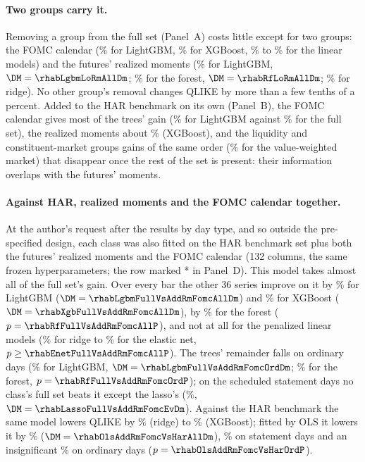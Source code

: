 \paragraph{Two groups carry it.}  Removing a group from the full set (Panel~A) costs little except for two groups: the
FOMC calendar (\rhabLgbmLoFomcAllPct\% for LightGBM, \rhabXgbLoFomcAllPct\% for XGBoost, \rhabRidgeLoFomcAllPct\% to
\rhabLassoLoFomcAllPct\% for the linear models) and the futures' realized moments (\rhabLgbmLoRmAllPct\% for LightGBM,
$\DM = \rhabLgbmLoRmAllDm$; \rhabRfLoRmAllPct\% for the forest, $\DM = \rhabRfLoRmAllDm$; \rhabRidgeLoRmAllPct\% for ridge).
No other group's removal changes QLIKE by more than a few tenths of a percent.  Added to the HAR benchmark on its own
(Panel~B), the FOMC calendar gives most of the trees' gain (\rhabLgbmAddFomcAllPct\% for LightGBM against
\rhabLgbmFullAllPct\% for the full set), the realized moments about \rhabXgbAddRmAllPct\% (XGBoost), and the liquidity
and constituent-market groups gains of the same order (\rhabXgbAddVwAllPct\% for the value-weighted market) that
disappear once the rest of the set is present: their information overlaps with the futures' moments.

\paragraph{Against HAR, realized moments and the FOMC calendar together.}  At the author's request after the results
by day type, and so outside the pre-specified design, each class was also fitted on the HAR benchmark set plus both
the futures' realized moments and the FOMC calendar (132 columns, the same frozen hyperparameters; the row marked * in
Panel~D).  This model takes almost all of the full set's gain.  Over every bar the other 36 series improve on it
by \rhabLgbmFullVsAddRmFomcAllPct\% for LightGBM ($\DM = \rhabLgbmFullVsAddRmFomcAllDm$) and
\rhabXgbFullVsAddRmFomcAllPct\% for XGBoost ($\DM = \rhabXgbFullVsAddRmFomcAllDm$), by \rhabRfFullVsAddRmFomcAllPct\%
for the forest ($p = \rhabRfFullVsAddRmFomcAllP$), and not at all for the penalized linear models
(\rhabRidgeFullVsAddRmFomcAllPct\% for ridge to \rhabEnetFullVsAddRmFomcAllPct\% for the elastic net, $p \geq
\rhabEnetFullVsAddRmFomcAllP$).  The trees' remainder falls on ordinary days (\rhabLgbmFullVsAddRmFomcOrdPct\% for
LightGBM, $\DM = \rhabLgbmFullVsAddRmFomcOrdDm$; \rhabRfFullVsAddRmFomcOrdPct\% for the forest, $p =
\rhabRfFullVsAddRmFomcOrdP$); on the \rhabNEventDays{} scheduled statement days no class's full set beats it except
the lasso's (\rhabLassoFullVsAddRmFomcEvPct\%, $\DM = \rhabLassoFullVsAddRmFomcEvDm$).  Against the HAR benchmark the
same model lowers QLIKE by \rhabRidgeAddRmFomcVsHarAllPct\% (ridge) to \rhabXgbAddRmFomcVsHarAllPct\% (XGBoost); fitted
by OLS it lowers it by \rhabOlsAddRmFomcVsHarAllPct\% ($\DM = \rhabOlsAddRmFomcVsHarAllDm$), \rhabOlsAddRmFomcVsHarEvPct\%
on statement days and an insignificant \rhabOlsAddRmFomcVsHarOrdPct\% on ordinary days ($p = \rhabOlsAddRmFomcVsHarOrdP$).

